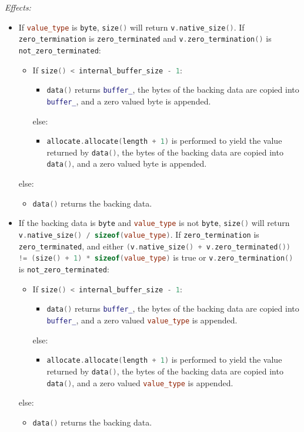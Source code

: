 \documentclass[11pt]{article}
\newcommand{\code}[2][cpp]{\lstinline[language=#1,basicstyle=\small\ttfamily]{#2}}
\newcommand{\desc}[1]{\textit{#1}}
\newcommand{\effects}{\desc{Effects: }}
\begin{document}
\effects
\begin{itemize}
    \item If \code{value_type} is \code{byte}, \code{size()} will return \code{v.native_size()}. If \code{zero_termination} is \code{zero_terminated} and \code{v.zero_termination()} is \code{not_zero_terminated}:
    \begin{itemize}
        \item If \code{size() < internal_buffer_size - 1}:
        \begin{itemize}
            \item \code{data()} returns \code{buffer_}, the bytes of the backing data are copied into \code{buffer_}, and a zero valued byte is appended. 
        \end{itemize}
        else:
        \begin{itemize}
            \item \code{allocate.allocate(length + 1)} is performed to yield the value returned by \code{data()}, the bytes of the backing data are copied into \code{data()}, and a zero valued byte is appended.
        \end{itemize}
    \end{itemize}
    else:
    \begin{itemize}
        \item \code{data()} returns the backing data.
    \end{itemize}
    
    \item If the backing data is \code{byte} and \code{value_type} is not \code{byte}, \code{size()} will return \code{v.native_size() / sizeof(value_type)}. If \code{zero_termination} is \code{zero_terminated}, and either \code{(v.native_size() + v.zero_terminated()) != (size() + 1) * sizeof(value_type)} is true or \code{v.zero_termination()} is \code{not_zero_terminated}:
    \begin{itemize}
        \item If \code{size() < internal_buffer_size - 1}:
        \begin{itemize}
            \item \code{data()} returns \code{buffer_}, the bytes of the backing data are copied into \code{buffer_}, and a zero valued \code{value_type} is appended. 
        \end{itemize}
        else:
        \begin{itemize}
            \item \code{allocate.allocate(length + 1)} is performed to yield the value returned by \code{data()}, the bytes of the backing data are copied into \code{data()}, and a zero valued \code{value_type} is appended.
        \end{itemize}
    \end{itemize}
    else:
    \begin{itemize}
        \item \code{data()} returns the backing data.
    \end{itemize}


\end{itemize}
\end{document}

